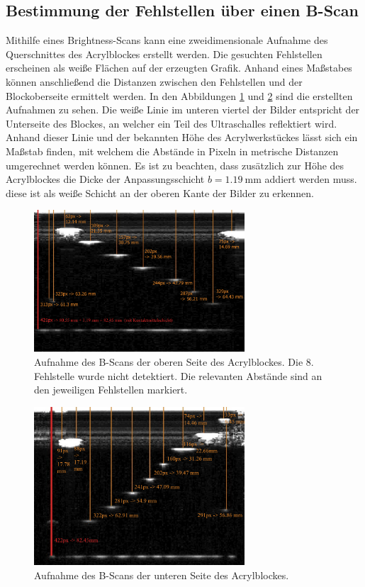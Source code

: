 \subsection{Bestimmung der Fehlstellen über einen B-Scan}
\label{subsec:b_scan}
Mithilfe eines Brightness-Scans kann eine zweidimensionale Aufnahme des Querschnittes des Acrylblockes erstellt werden. Die gesuchten Fehlstellen erscheinen als 
weiße Flächen auf der erzeugten Grafik. Anhand eines Maßstabes können anschließend die Distanzen zwischen den Fehlstellen und der Blockoberseite ermittelt werden.
In den Abbildungen \ref{fig:B_Scan_oben} und \ref{fig:B_Scan_unten} sind die erstellten Aufnahmen zu sehen. Die weiße Linie im unteren viertel der Bilder entspricht
der Unterseite des Blockes, an welcher ein Teil des Ultraschalles reflektiert wird. Anhand dieser Linie und der bekannten Höhe des Acrylwerkstückes lässt sich ein
Maßstab finden, mit welchem die Abstände in Pixeln in metrische Distanzen umgerechnet werden können. Es ist zu beachten, dass zusätzlich zur Höhe des Acrylblockes
die Dicke der Anpassungsschicht $b = \qty{1.19}{\milli\metre}$ addiert werden muss. diese ist als weiße Schicht an der oberen Kante der Bilder zu erkennen.

\begin{figure}
  \centering
\includegraphics[width=0.7\textwidth]{content/B_Scan_oben_auswertung.pdf}
  \caption{Aufnahme des B-Scans der oberen Seite des Acrylblockes. Die 8. Fehlstelle wurde nicht detektiert.
  Die relevanten Abstände sind an den jeweiligen Fehlstellen markiert.}
  \label{fig:B_Scan_oben}
\end{figure}

\begin{figure}
  \centering
\includegraphics[width=0.7\textwidth]{content/B_Scan_unten_auswertung.pdf}
  \caption{Aufnahme des B-Scans der unteren Seite des Acrylblockes.}
  \label{fig:B_Scan_unten}
\end{figure}

